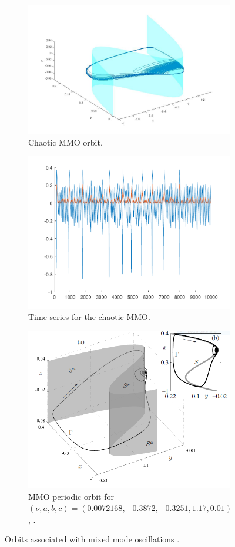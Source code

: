 \begin{figure}[h!]
	\centering
	\begin{subfigure}[t]{0.45\textwidth}
		\centering
		\includegraphics[width=.8\linewidth]{Images/chaoticEvdp}
	\caption{Chaotic MMO orbit.}
	\label{fig: MMo3pic}
	\end{subfigure}
	\hfill
	\begin{subfigure}[t]{0.45\textwidth}
		\includegraphics[width=.8\linewidth]{Images/eVDPts}
	\caption{Time series for the chaotic MMO.}
	\label{fig: MMo4pic}
	\end{subfigure}
	\begin{subfigure}[t]{0.45\textwidth}
		\includegraphics[width=.8\linewidth]{Images/MMO3}
		\caption{MMO periodic orbit for $(\nu,a,b,c)= (0.0072168,-0.3872,-0.3251,1.17,0.01)$, \citep{MMO}.}
		\label{fig: MMo5pic}
	\end{subfigure}
	\caption{Orbits associated with mixed mode oscillations \citep{MMO}.}
\end{figure}\newpage
